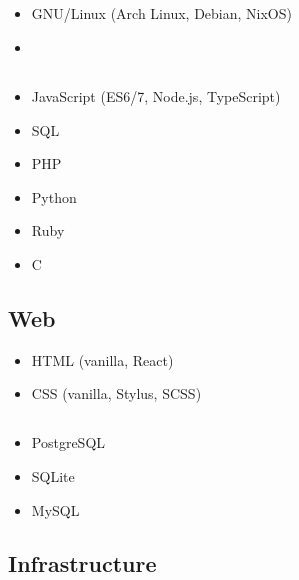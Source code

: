 \documentclass{article}
\begin{document}
\subsection*{}

\begin{itemize}
  \item GNU/Linux (Arch Linux, Debian, NixOS)
  \item
\end{itemize}

\subsection*{}

\begin{itemize}
  \item JavaScript (ES6/7, Node.js, TypeScript)
  \item SQL
  \item PHP
  \item Python
  \item Ruby
  \item C
\end{itemize}

\subsection*{Web}

\begin{itemize}
  \item HTML (vanilla, React)
  \item CSS (vanilla, Stylus, SCSS)
\end{itemize}

\subsection*{}

\begin{itemize}
  \item PostgreSQL
  \item SQLite
  \item MySQL
\end{itemize}

\subsection*{Infrastructure}
\end{document}
